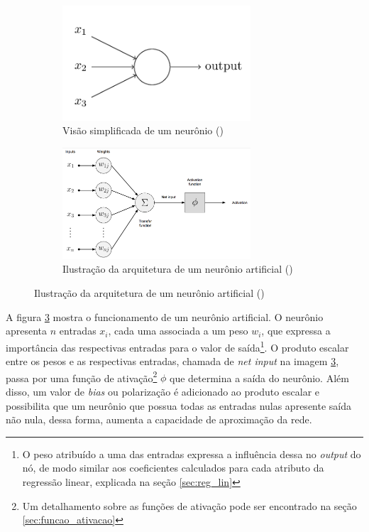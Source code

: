 \begin{figure}[H] 
  \centering
  \begin{subfigure}{7cm}
    \centering 
    \includegraphics[width=7cm]{../figuras/perceptron-simples.png}
    \caption{Visão simplificada de um neurônio (\cite{deeplearningbook})}
    \label{fig:perceptron-simples}
  \end{subfigure}
  \hfill
  \begin{subfigure}{7cm}
    \centering
    \includegraphics[width=7cm]{../figuras/perceptron.png}
    \caption{Ilustração da arquitetura de um 
    neurônio artificial (\cite{dl-oreilly})}
    \label{fig:perceptron}
  \end{subfigure}
\end{figure}

A figura \ref{fig:perceptron} mostra o funcionamento de 
um neurônio artificial. O neurônio apresenta $n$ entradas 
$x_i$, cada uma associada a um peso $w_i$, que expressa 
a importância das respectivas entradas para o valor de saída\footnote{ 
O peso atribuído a uma das entradas expressa a influência
dessa no \textit{output} do nó, de modo similar aos coeficientes calculados 
para cada atributo da regressão linear, explicada na seção \ref{sec:reg_lin}}.
O produto escalar entre os pesos e as respectivas entradas, 
chamada de \textit{net input}
na imagem \ref{fig:perceptron}, passa por uma função de 
ativação\footnote{Um detalhamento sobre as funções de 
ativação pode ser encontrado na seção \ref{sec:funcao_ativacao}} 
$\phi$ que determina a saída do neurônio. 
Além disso, um valor de \textit{bias} ou polarização é
adicionado ao produto escalar e possibilita que 
um neurônio que possua todas as entradas nulas
apresente saída não nula, dessa forma,
aumenta a capacidade de aproximação da rede. 
\cite{deeplearningbook}

